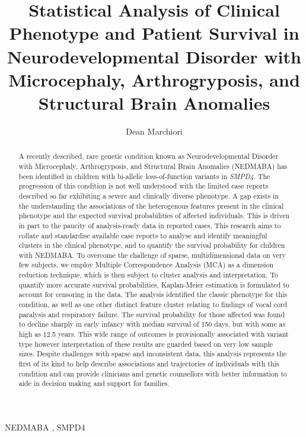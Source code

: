 \documentclass[
  authoryear,
  preprint,
  3p]{elsarticle}
\begin{document}
\begin{frontmatter}
\title{Statistical Analysis of Clinical Phenotype and Patient Survival
in Neurodevelopmental Disorder with Microcephaly, Arthrogryposis, and
Structural Brain Anomalies}
\author[]{Dean Marchiori%
%
}



        
\begin{abstract}
A recently described, rare genetic condition known as Neurodevelopmental
Disorder with Microcephaly, Arthrogryposis, and Structural Brain
Anomalies (NEDMABA) has been identified in children with bi-allelic
loss-of-function variants in \emph{SMPD4}. The progression of this
condition is not well understood with the limited case reports described
so far exhibiting a severe and clinically diverse phenotype. A gap
exists in the understanding the associations of the heterogenous
features present in the clinical phenotype and the expected survival
probabilities of affected individuals. This is driven in part to the
paucity of analysis-ready data in reported cases. This research aims to
collate and standardise available case reports to analyse and identify
meaningful clusters in the clinical phenotype, and to quantify the
survival probability for children with NEDMABA. To overcome the
challenge of sparse, multidimensional data on very few subjects, we
employ Multiple Correspondence Analysis (MCA) as a dimension reduction
technique, which is then subject to cluster analysis and interpretation.
To quantify more accurate survival probabilities, Kaplan-Meier
estimation is formulated to account for censoring in the data. The
analysis identified the classic phenotype for this condition, as well as
one other distinct feature cluster relating to findings of vocal cord
paralysis and respiratory failure. The survival probability for those
affected was found to decline sharply in early infancy with median
survival of 150 days, but with some as high as 12.5 years. This wide
range of outcomes is provisionally associated with variant type however
interpretation of these results are guarded based on very low sample
sizes. Despite challenges with sparse and inconsistent data, this
analysis represents the first of its kind to help describe associations
and trajectories of individuals with this condition and can provide
clinicians and genetic counsellors with better information to aide in
decision making and support for families.
\end{abstract}





\begin{keyword}
    NEDMABA \sep 
    SMPD4
\end{keyword}
\end{frontmatter}\ifdefined\Shaded\renewenvironment{Shaded}{\begin{tcolorbox}[interior hidden, sharp corners, enhanced, borderline west={3pt}{0pt}{shadecolor}, boxrule=0pt, breakable, frame hidden]}{\end{tcolorbox}}\fi
\end{document}
